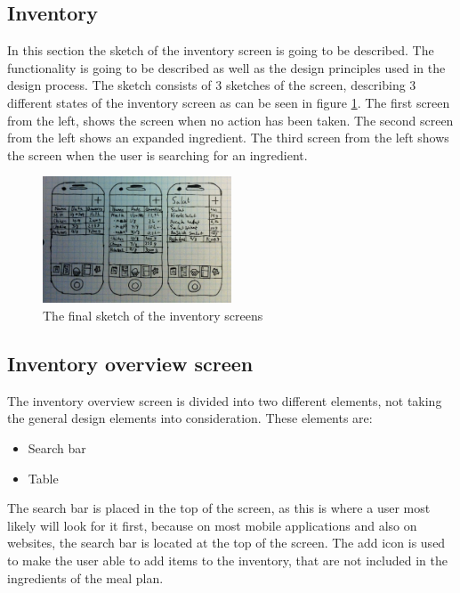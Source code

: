 \subsection{Inventory} \label{InventoryScreen}

In this section the sketch of the inventory screen is going to be described. The functionality is going to be described as well as the design principles used in the design process. The sketch consists of 3 sketches of the screen, describing 3 different states of the inventory screen as can be seen in figure \ref{FinalInventorySketch}. The first screen from the left, shows the screen when no action has been taken. The second screen from the left shows an expanded ingredient. The third screen from the left shows the screen when the user is searching for an ingredient.

\begin{figure}[H]
    \centering
    \includegraphics[width=0.5\textwidth]{Grafik/FoodPlanner/FinalInventorySketch}
    \caption{The final sketch of the inventory screens}
    \label{FinalInventorySketch}
\end{figure}

\subsection{Inventory overview screen}

The inventory overview screen is divided into two different elements, not taking the general design elements into consideration. These elements are:

\begin{itemize}
    \item Search bar
    \item Table
\end{itemize}

The search bar is placed in the top of the screen, as this is where a user most likely will look for it first, because on most mobile applications and also on websites, the search bar is located at the
top of the screen. The add icon is used to make the user able to add items to the inventory, that are not included in the ingredients of the meal plan.


